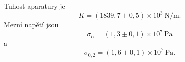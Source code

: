 \documentclass[protokol.tex]{subfiles}
\begin{document}
Tuhost aparatury je 
$$ K = (1839,7 \pm 0,5) \times 10^3 \ \si{\newton\per\metre}. $$
Mezní napětí jsou 
$$ \sigma_U = (1,3 \pm 0,1) \times 10^7 \ \si{\pascal} $$
a
$$ \sigma_{0,2} = (1,6 \pm 0,1) \times 10^7 \ \si{\pascal}. $$
\end{document}
